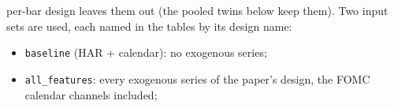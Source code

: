 per-bar design leaves them out (the pooled twins below keep them). Two input
sets are used, each named in the tables by its design name:
\begin{itemize}\sloppy
\itemsep2pt
\item \texttt{baseline} (HAR + calendar): no exogenous series;
\item \texttt{all\_features}: every exogenous series of the paper's design,
      the FOMC calendar channels included;
\end{itemize}
